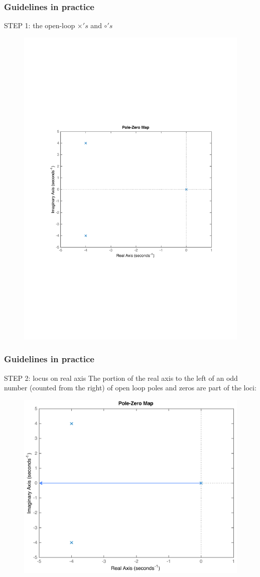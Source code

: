 \begin{frame}
\frametitle{Guidelines in practice}
	\begin{block}{STEP 1: the open-loop $\times's$ and $\circ's$}
		\begin{figure}
			\centering
			\includegraphics[width=0.6\linewidth]{how_to_draw_ex1}
		\end{figure}
	\end{block}
\end{frame}

\begin{frame}
\frametitle{Guidelines in practice}
	\begin{block}{STEP 2: locus on real axis}
		The portion of the real axis to the left of an odd number (counted from the right) of open loop poles and zeros are part of the loci:
		\vspace{-0.5em}
		\begin{figure}
			\centering
			\includegraphics[width=0.6\linewidth]{how_to_draw_ex2}
		\end{figure}
	\end{block}
\end{frame}

